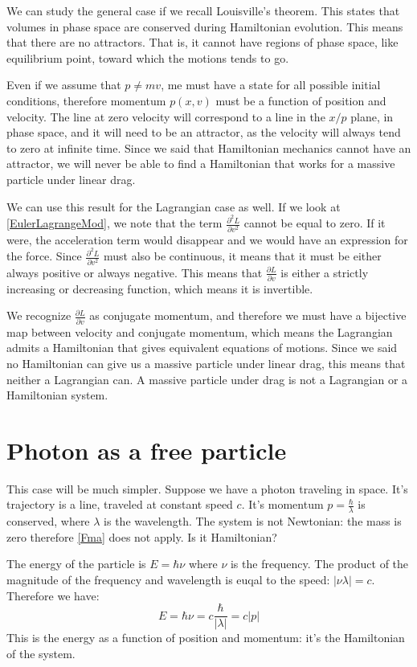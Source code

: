 \documentclass[11pt]{article}
\begin{document}
We can study the general case if we recall Louisville's theorem. This states that volumes in phase space are conserved during Hamiltonian evolution. This means that there are no attractors. That is, it cannot have regions of phase space, like equilibrium point, toward which the motions tends to go.

Even if we assume that $p \neq mv$, me must have a state for all possible initial conditions, therefore momentum $p(x,v)$ must be a function of position and velocity. The line at zero velocity will correspond to a line in the $x/p$ plane, in phase space, and it will need to be an attractor, as the velocity will always tend to zero at infinite time. Since we said that Hamiltonian mechanics cannot have an attractor, we will never be able to find a Hamiltonian that works for a massive particle under linear drag.

We can use this result for the Lagrangian case as well. If we look at \eqref{EulerLagrangeMod}, we note that the term $\frac{\partial^2 L}{\partial v^2}$ cannot be equal to zero. If it were, the acceleration term would disappear and we would have an expression for the force. Since $\frac{\partial^2 L}{\partial v^2}$ must also be continuous, it means that it must be either always positive or always negative. This means that $\frac{\partial L}{\partial v}$ is either a strictly increasing or decreasing function, which means it is invertible.

We recognize $\frac{\partial L}{\partial v}$ as conjugate momentum, and therefore we must have a bijective map between velocity and conjugate momentum, which means the Lagrangian admits a Hamiltonian that gives equivalent equations of motions. Since we said no Hamiltonian can give us a massive particle under linear drag, this means that neither a Lagrangian can. A massive particle under drag is not a Lagrangian or a Hamiltonian system.

\section{Photon as a free particle}

This case will be much simpler. Suppose we have a photon traveling in space. It's trajectory is a line, traveled at constant speed $c$. It's momentum $p=\frac{\hbar}{\lambda}$ is conserved, where $\lambda$ is the wavelength. The system is not Newtonian: the mass is zero therefore \eqref{Fma} does not apply. Is it Hamiltonian?

The energy of the particle is $E=\hbar \nu$ where $\nu$ is the frequency. The product of the magnitude of the frequency and wavelength is euqal to the speed: $|\nu \lambda| = c$. Therefore we have:
\begin{equation*}
E=\hbar \nu = c \frac{\hbar}{|\lambda|} = c|p| \end{equation*}
This is the energy as a function of position and momentum: it's the Hamiltonian of the system.
\end{document}
